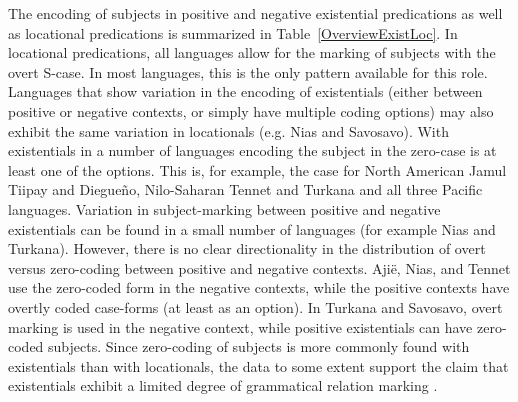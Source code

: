 

The encoding of subjects in positive and negative existential predications as well as locational predications is summarized in Table~\ref{OverviewExistLoc}. 
In locational predications, all languages allow for the marking of subjects with the overt S-case. 
In most languages, this is the only pattern available for this role. 
Languages that show variation in the encoding of existentials (either between positive or negative contexts, or simply have multiple coding options) may also exhibit the same variation in locationals (e.g. Nias and Savosavo). 
With existentials in a number of languages encoding the subject in the zero-case is at least one of the options. 
This is, for example, the case for North American Jamul Tiipay and Diegue\~no, Nilo-Saharan Tennet and Turkana and all three Pacific languages. 
Variation in subject-marking between positive and negative existentials can be found in a small number of languages (for example Nias and Turkana). 
However, there is no clear directionality in the distribution of overt versus zero-coding between positive and negative contexts. 
Aji\"e, Nias, and Tennet use the zero-coded form in the negative contexts, while the positive contexts have overtly coded case-forms (at least as an option). 
In Turkana and Savosavo, overt marking is used in the negative context, while positive existentials can have zero-coded subjects. 
Since zero-coding of subjects is more commonly found with existentials than with locationals, the data to some extent support the claim that existentials exhibit a limited degree of grammatical relation marking \citep[123]{Payne:1997}.

